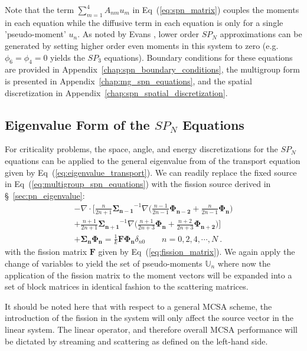 Note that the term $\sum_{m=1}^4 A_{nm} u_m$ in
Eq~(\ref{eq:spn_matrix}) couples the moments in each equation while
the diffusive term in each equation is only for a single
'pseudo-moment' $u_n$. As noted by Evans \citep{evans_simpli_2013},
lower order $SP_N$ approximations can be generated by setting higher
order even moments in this system to zero (e.g. $\phi_6 = \phi_4 = 0$
yields the $SP_3$ equations). Boundary conditions for these equations
are provided in Appendix~\ref{chap:spn_boundary_conditions}, the
multigroup form is presented in Appendix~\ref{chap:mg_spn_equations},
and the spatial discretization in
Appendix~\ref{chap:spn_spatial_discretization}.

\subsection{Eigenvalue Form of the $SP_N$ Equations}
\label{subsec:eigenvalue_form}
For criticality problems, the space, angle, and energy discretizations
for the $SP_N$ equations can be applied to the general eigenvalue from
of the transport equation given by
Eq~(\ref{eq:eigenvalue_transport}). We can readily replace the fixed
source in Eq~(\ref{eq:multigroup_spn_equations}) with the fission
source derived in \S~\ref{sec:pn_eigenvalue}:
\begin{multline}
  -\nabla \cdot \Bigg[\frac{n}{2n+1}\mathbf{\Sigma_{n-1}}^{-1} \nabla
    \Big(\frac{n-1}{2n-1} \mathbf{\Phi_{n-2}} +
    \frac{n}{2n-1}\mathbf{\Phi_n} \Big) \\+
    \frac{n+1}{2n+1}\mathbf{\Sigma_{n+1}}^{-1} \nabla
    \Big(\frac{n+1}{2n+3}\mathbf{\Phi_n} +
    \frac{n+2}{2n+3}\mathbf{\Phi_{n+2}}\Big) \Bigg] \\+
  \mathbf{\Sigma_n} \mathbf{\Phi_n} = \frac{1}{k} \mathbf{F}
  \mathbf{\Phi_n} \delta_{n0} \ \ \ \ \ \ \ \ \ n = 0,2,4,\cdots,N\:.
  \label{eq:multigroup_spn_eigenvalue}
\end{multline}
with the fission matrix $\mathbf{F}$ given by
Eq~(\ref{eq:fission_matrix}). We again apply the change of variables
to yield the set of pseudo-moments $\mathbb{U}_n$ where now the
application of the fission matrix to the moment vectors will be
expanded into a set of block matrices in identical fashion to the
scattering matrices.

It should be noted here that with respect to a general MCSA scheme,
the introduction of the fission in the system will only affect the
source vector in the linear system. The linear operator, and therefore
overall MCSA performance will be dictated by streaming and scattering
as defined on the left-hand side.

